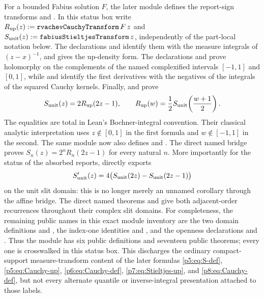 \documentclass[11pt,oneside]{article}
\theoremstyle{definition}
\theoremstyle{remark}
\newcommand{\1}{\mathbf 1}
\begin{document}
\begin{statusbox}
For a bounded Fabius solution \(F\), the later module
 defines the report-sign transforms
 and
.  In this status box write
\(R_{\rm up}(z):=\mathtt{rvachevCauchyTransform}\,F\,z\) and
\(S_{\rm unit}(z):=\mathtt{fabiusStieltjesTransform}\,z\), independently of the
part-local notation below.  The declarations
 and
 identify them with the measure integrals of
\((z-x)^{-1}\), and
 gives the up-density form.
The declarations  and
 prove holomorphy on the complements of
the named complexified intervals \([-1,1]\) and \([0,1]\), while
 and
 identify the first derivatives with
the negatives of the integrals of the squared Cauchy kernels.  Finally,
 and
 prove
\[
 S_{\rm unit}(z)=2R_{\rm up}(2z-1),\qquad
 R_{\rm up}(w)=\frac12S_{\rm unit}\!\left(\frac{w+1}{2}\right).
\]
The equalities are total in Lean's Bochner-integral convention.  Their classical analytic
interpretation uses \(z\notin[0,1]\) in the first formula and
\(w\notin[-1,1]\) in the second.
The same module now also defines  and
.  The direct named bridge
 proves
\(S_n(z)=2^nR_n(2z-1)\) for every natural \(n\).  More importantly for the status of the
absorbed reports,  directly
exports
\[
 S'_{\rm unit}(z)=4\bigl(S_{\rm unit}(2z)-S_{\rm unit}(2z-1)\bigr)
\]
on the unit slit domain: this is no longer merely an unnamed corollary through the affine
bridge.  The direct named theorems  and
 give both adjacent-order recurrences throughout
their complex slit domains.
For completeness, the remaining public names in this exact module inventory are the two
domain definitions  and
, the index-one identities
 and , and the
openness declarations  and
.  Thus the module has six public definitions
and seventeen public theorems; every one is crosswalked in this status box.
This discharges the ordinary compact-support measure-transform content of the later
formulas \eqref{p5:eq:S-def}, \eqref{p5:eq:Cauchy-up},
\eqref{p6:eq:Cauchy-def}, \eqref{p7:eq:Stieltjes-up},
and \eqref{p8:eq:Cauchy-def}, but not every alternate
quantile or inverse-integral presentation attached to those labels.


\end{statusbox}
\end{document}
